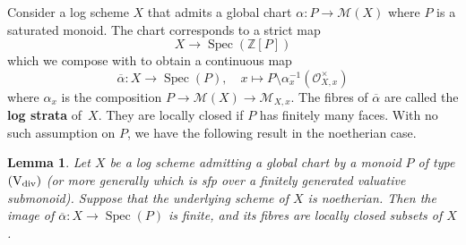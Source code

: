 \documentclass[a4paper,twoside,11pt,reqno]{amsart}
\renewcommand{\mathbb}{\mathds}
\newcommand{\bZ}{{\mathbb Z}}
\newcommand{\cM}{{\mathcal M}}
\newcommand{\cO}{{\mathcal O}}
\newcommand{\la}{\longrightarrow}
\DeclareMathOperator{\Spec}{Spec}
\newcommand{\ov}[1]{\overline{#1}}
\newcommand{\typeVd}{(\mathrm{V}_{\rm div})}
\newtheorem{lem}[thm]{Lemma}
\theoremstyle{definition}
\numberwithin{equation}{subsection}
\begin{document}
Consider a log scheme $X$ that admits a global chart $\alpha\colon P\to \cM(X)$ where $P$ is a saturated monoid. The chart corresponds to a strict map
\[ 
    X \la \Spec(\bZ[P])
\]
which we compose with  to obtain a continuous map
\[ 
    \ov\alpha\colon X \la \Spec(P), \quad x \mapsto P \setminus \alpha^{-1}_x(\cO_{X,x}^\times)
\]
where $\alpha_x$ is the composition $P\to \cM(X) \to \cM_{X,x}$. The fibres of $\ov\alpha$ are called the {\bf log strata} of~$X$. They are locally closed if $P$ has finitely many faces. With no such assumption on $P$, we have the following result in the noetherian case.

\begin{lem} \label{lem:noeth-faces}
    Let $X$ be a log scheme admitting a global chart by a monoid $P$ of type $\typeVd$ (or more generally which is sfp over a finitely generated valuative submonoid). Suppose that the underlying scheme of $X$ is noetherian. Then the image of $\ov\alpha\colon X\to \Spec(P)$ is finite, and its fibres are locally closed subsets of $X$. 
\end{lem}
\end{document}
